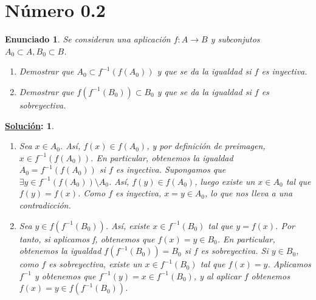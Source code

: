 \documentclass[10pt,a4paper,openright]{book}
\theoremstyle{break}
\newtheorem*{enun}{Enunciado}
\newtheorem*{sol}{\underline{Solución}:}
\begin{document}
\section{Número 0.2}
\begin{enun}
Se consideran una aplicación $f: A \rightarrow B$ y subconjutos $A_0 \subset A, B_0 \subset B$.
\begin{enumerate}[label={(\arabic*)}]
 \item Demostrar que $A_0 \subset f^{-1}(f(A_0))$ y que se da la igualdad si $f$  es inyectiva.
 \item Demostrar que $f(f^{-1}(B_0)) \subset B_0$ y que se da la igualdad si $f$ es sobreyectiva.
\end{enumerate}
\end{enun}
\begin{sol}
\begin{enumerate}[label={(\arabic*)}]
 \item Sea $x \in A_0$. Así, $f(x) \in f(A_0)$, y por definición de preimagen, $x \in f^{-1}(f(A_0))$. En particular, obtenemos la igualdad $A_0 
 = f^{-1}(f(A_0))$ si $f$ es inyectiva. Supongamos que $\exists y \in f^{-1}(f(A_0)) \setminus A_0$. Así, $f(y) \in f(A_0)$, luego existe un $x \in A_0$ tal que $f(y) = f(x)$. Como $f$ es inyectiva, $x = y \in A_0$, lo que nos lleva a una contradicción. 
 \item Sea $y \in f(f^{-1}(B_0))$. Así, existe $x \in f^{-1}(B_0)$ tal que $y = f(x)$. Por tanto, si aplicamos f, obtenemos que $f(x) = y \in B_0$. En particular, obtenemos la igualdad $f(f^{-1}(B_0)) = B_0$ si $f$ es sobreyectiva. Si $y \in B_0$, como $f$ es sobreyectiva, existe un $x \in f^{-1} (B_0)$ tal que $f(x) = y$. Aplicamos $f^{-1}$ y obtenemos que $f^{-1}(y) = x \in f^{-1}(B_0)$, y al aplicar $f$ obtenemos $f(x) = y \in f(f^{-1}(B_0))$.
\end{enumerate}
\end{sol}
\end{document}
